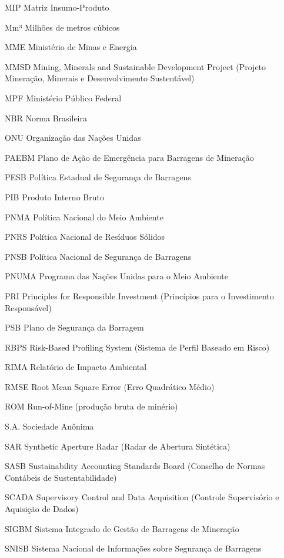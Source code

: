 \begin{siglas}
    \item[MIP] Matriz Insumo-Produto
    \item[Mm³] Milhões de metros cúbicos
    \item[MME] Ministério de Minas e Energia
    \item[MMSD] Mining, Minerals and Sustainable Development Project (Projeto Mineração, Minerais e Desenvolvimento Sustentável)
    \item[MPF] Ministério Público Federal
    \item[NBR] Norma Brasileira
    \item[ONU] Organização das Nações Unidas
    \item[PAEBM] Plano de Ação de Emergência para Barragens de Mineração
    \item[PESB] Política Estadual de Segurança de Barragens
    \item[PIB] Produto Interno Bruto
    \item[PNMA] Política Nacional do Meio Ambiente
    \item[PNRS] Política Nacional de Resíduos Sólidos
    \item[PNSB] Política Nacional de Segurança de Barragens
    \item[PNUMA] Programa das Nações Unidas para o Meio Ambiente
    \item[PRI] Principles for Responsible Investment (Princípios para o Investimento Responsável)
    \item[PSB] Plano de Segurança da Barragem
    \item[RBPS] Risk-Based Profiling System (Sistema de Perfil Baseado em Risco)
    \item[RIMA] Relatório de Impacto Ambiental
    \item[RMSE] Root Mean Square Error (Erro Quadrático Médio)
    \item[ROM] Run-of-Mine (produção bruta de minério)
    \item[S.A.] Sociedade Anônima
    \item[SAR] Synthetic Aperture Radar (Radar de Abertura Sintética)
    \item[SASB] Sustainability Accounting Standards Board (Conselho de Normas Contábeis de Sustentabilidade)
    \item[SCADA] Supervisory Control and Data Acquisition (Controle Supervisório e Aquisição de Dados)
    \item[SIGBM] Sistema Integrado de Gestão de Barragens de Mineração
    \item[SNISB] Sistema Nacional de Informações sobre Segurança de Barragens

\end{siglas}
